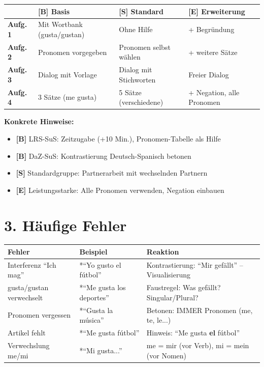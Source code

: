 \documentclass[11pt, a4paper]{article}
\newcommand{\B}{\textcolor{basis}{\textbf{[B]}}}
\newcommand{\Std}{\textcolor{standard}{\textbf{[S]}}}
\newcommand{\E}{\textcolor{erweiterung}{\textbf{[E]}}}
\begin{document}
\vspace{1em}

\begin{tabularx}{\textwidth}{|l|X|X|X|}
\hline
& \B{} \textbf{Basis} & \Std{} \textbf{Standard} & \E{} \textbf{Erweiterung} \\
\hline
\textbf{Aufg. 1} & Mit Wortbank (gusta/gustan) & Ohne Hilfe & + Begründung \\
\hline
\textbf{Aufg. 2} & Pronomen vorgegeben & Pronomen selbst wählen & + weitere Sätze \\
\hline
\textbf{Aufg. 3} & Dialog mit Vorlage & Dialog mit Stichworten & Freier Dialog \\
\hline
\textbf{Aufg. 4} & 3 Sätze (me gusta) & 5 Sätze (verschiedene) & + Negation, alle Pronomen \\
\hline
\end{tabularx}

\vspace{1em}

\textbf{Konkrete Hinweise:}
\begin{itemize}
    \item \B{} LRS-SuS: Zeitzugabe (+10 Min.), Pronomen-Tabelle als Hilfe
    \item \B{} DaZ-SuS: Kontrastierung Deutsch-Spanisch betonen
    \item \Std{} Standardgruppe: Partnerarbeit mit wechselnden Partnern
    \item \E{} Leistungsstarke: Alle Pronomen verwenden, Negation einbauen
\end{itemize}


\section*{3. Häufige Fehler}

\begin{fehlerbox}
\begin{tabularx}{\textwidth}{|l|X|X|}
\hline
\textbf{Fehler} & \textbf{Beispiel} & \textbf{Reaktion} \\
\hline
Interferenz ``Ich mag'' & *``Yo gusto el fútbol'' & Kontrastierung: ``Mir gefällt'' -- Visualisierung \\
\hline
gusta/gustan verwechselt & *``Me gusta los deportes'' & Faustregel: Was gefällt? Singular/Plural? \\
\hline
Pronomen vergessen & *``Gusta la música'' & Betonen: IMMER Pronomen (me, te, le...) \\
\hline
Artikel fehlt & *``Me gusta fútbol'' & Hinweis: ``Me gusta \textbf{el} fútbol'' \\
\hline
Verwechslung me/mi & *``Mi gusta...'' & me = mir (vor Verb), mi = mein (vor Nomen) \\
\hline
\end{tabularx}
\end{fehlerbox}
\end{document}
